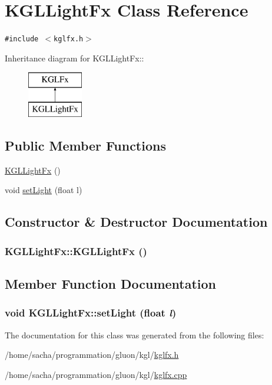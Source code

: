 \hypertarget{class_k_g_l_light_fx}{
\section{KGLLightFx Class Reference}
\label{class_k_g_l_light_fx}
}
{\tt \#include $<$kglfx.h$>$}

Inheritance diagram for KGLLightFx::\begin{figure}[H]
\begin{center}
\leavevmode
\includegraphics[height=2cm]{class_k_g_l_light_fx}
\end{center}
\end{figure}
\subsection*{Public Member Functions}
\begin{CompactItemize}
\item 
\hyperlink{class_k_g_l_light_fx_ef8e2da38e34d652c53c91f8becf0e60}{KGLLightFx} ()
\item 
void \hyperlink{class_k_g_l_light_fx_247efd2e5d7ba3e4db7163b32d3b7d77}{setLight} (float l)
\end{CompactItemize}


\subsection{Constructor \& Destructor Documentation}
\hypertarget{class_k_g_l_light_fx_ef8e2da38e34d652c53c91f8becf0e60}{
\subsubsection[{KGLLightFx}]{\setlength{\rightskip}{0pt plus 5cm}KGLLightFx::KGLLightFx ()}}
\label{class_k_g_l_light_fx_ef8e2da38e34d652c53c91f8becf0e60}




\subsection{Member Function Documentation}
\hypertarget{class_k_g_l_light_fx_247efd2e5d7ba3e4db7163b32d3b7d77}{
\subsubsection[{setLight}]{\setlength{\rightskip}{0pt plus 5cm}void KGLLightFx::setLight (float {\em l})}}
\label{class_k_g_l_light_fx_247efd2e5d7ba3e4db7163b32d3b7d77}




The documentation for this class was generated from the following files:\begin{CompactItemize}
\item 
/home/sacha/programmation/gluon/kgl/\hyperlink{kglfx_8h}{kglfx.h}\item 
/home/sacha/programmation/gluon/kgl/\hyperlink{kglfx_8cpp}{kglfx.cpp}\end{CompactItemize}
